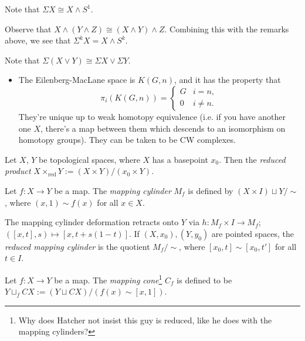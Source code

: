 \documentclass{MetricNotes2023}
\begin{document}
\begin{remark}
Note that \(\Sigma X \cong X\wedge S^1\). 
\end{remark}

\begin{remark}
Observe that \(X\wedge (Y\wedge Z)\cong (X\wedge Y)\wedge Z\). Combining this with the remarks above, we see that \(\Sigma^kX=X\wedge S^k\). 
\end{remark}

\begin{remark}\label{2502211505}
Note that \(\Sigma(X\vee Y)\cong \Sigma X\vee \Sigma Y\).
\end{remark}

\begin{itemize}
\item The Eilenberg-MacLane space is \(K(G, n)\), and it has the property that 
\[\pi_i(K(G, n))=\begin{cases}
G & i=n,\\
0 & i\neq n.
\end{cases}\]
They're unique up to weak homotopy equivalence (i.e. if you have another one \(X\), there's a map between them which descends to an isomorphism on homotopy groups). They can be taken to be CW complexes. 
\end{itemize}

\begin{definition}
Let \(X\), \(Y\) be topological spaces, where \(X\) has a basepoint \(x_0\). Then the \textit{reduced product} \(X\times_{\text{red}}Y:=(X\times Y)/(x_0 \times Y)\). 
\end{definition}

\begin{definition}
Let \(f : X \to Y\) be a map. The \textit{mapping cylinder} \(M_f\) is defined by \((X\times I)\sqcup Y/\sim\), where \((x,1)\sim f(x)\) for all \(x \in X\). 
\end{definition}

The mapping cylinder deformation retracts onto \(Y\) via \(h : M_f \times I\to M_f\); \(([x,t], s)\mapsto [x, t+s(1-t)]\). If \((X, x_0), (Y, y_0)\) are pointed spaces, the \textit{reduced mapping cylinder} is the quotient \(M_f/\sim\), where \([x_0, t]\sim [x_0, t']\) for all \( t\in I\).

\begin{definition}
Let \(f : X \to Y\) be a map. The \textit{mapping cone}\footnote{Why does Hatcher not insist this guy is reduced, like he does with the mapping cylinders?} \(C_f\) is defined to be \(Y\sqcup_f CX:=(Y\sqcup CX)/(f(x)\sim [x,1])\). 
\end{definition}
\end{document}
